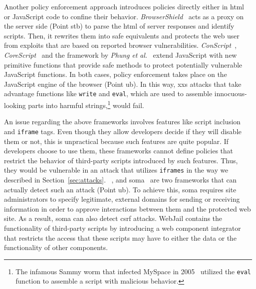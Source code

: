 \documentclass[conference]{IEEEtran}
\begin{document}
Another policy enforcement approach introduces
policies directly either in {\sc html} or JavaScript code
to confine their behavior. {\it BrowserShield}~\cite{RDWDE07}
acts as a proxy on the server side (Point {\sc s}t{\sc b}) to
parse the {\sc html} of server responses and identify
scripts. Then, it rewrites them into safe equivalents
and protects the web user from exploits
that are based on reported browser vulnerabilities.
{\it ConScript}~\cite{ML10}, {\it CoreScript}~\cite{YCIS07}
and the framework by {\it Phung et al.}~\cite{PSC09}
extend JavaScript with new primitive functions that
provide safe methods to protect potentially vulnerable
JavaScript functions. In both cases, policy enforcement takes
place on the JavaScript engine of the browser (Point {\sc ub}).
In this way, {\sc xxs} attacks that take advantage
functions like {\tt write} and {\tt eval}, which are
used to assemble innocuous-looking parts into harmful
strings,\footnote{The infamous Sammy worm that
infected MySpace in 2005~\cite{SP07,ELX07}
utilized the {\tt eval} function to assemble a
script with malicious behavior.} would fail.

An issue regarding the above frameworks
involves features like script inclusion
and {\tt iframe} tags. Even though they allow developers
decide if they will disable them or not,
this is unpractical because such features are quite popular.
If developers choose to use them, these frameworks cannot
define policies that restrict the behavior of third-party
scripts introduced by such features. Thus, they would
be vulnerable in an attack that utilizes {\tt iframes}
in the way we described in Section~\ref{sec:attacks}.
~\cite{VDDPJ11}, and {\sc soma}~\cite{OWVS08}
are two frameworks that can actually detect such an attack (Point {\sc
  ub}). To achieve this, {\sc soma} requires site administrators to
specify legitimate, external domains for sending or receiving
information in order to approve interactions between them and the
protected web site. As a result, {\sc soma} can also detect {\sc csrf}
attacks. WebJail contains the functionality of third-party scripts by
introducing a web component integrator that restricts the access that
these scripts may have to either the data or the functionality of
other components.
\end{document}
